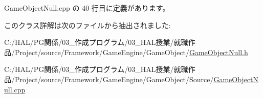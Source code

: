  Game\+Object\+Null.\+cpp の 40 行目に定義があります。



このクラス詳解は次のファイルから抽出されました\+:\begin{DoxyCompactItemize}
\item 
C\+:/\+H\+A\+L/\+P\+G関係/03\+\_\+作成プログラム/03\+\_\+\+H\+A\+L授業/就職作品/\+Project/source/\+Framework/\+Game\+Engine/\+Game\+Object/\mbox{\hyperlink{_game_object_null_8h}{Game\+Object\+Null.\+h}}\item 
C\+:/\+H\+A\+L/\+P\+G関係/03\+\_\+作成プログラム/03\+\_\+\+H\+A\+L授業/就職作品/\+Project/source/\+Framework/\+Game\+Engine/\+Game\+Object/\+Source/\mbox{\hyperlink{_game_object_null_8cpp}{Game\+Object\+Null.\+cpp}}\end{DoxyCompactItemize}
